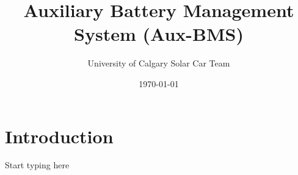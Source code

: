 \documentclass[titlepage]{article}
\title{\textbf{Auxiliary Battery Management System (Aux-BMS)}}
\author{University of Calgary Solar Car Team}
\date{\today}
\begin{document}
    \maketitle
    \section{Introduction}
    Start typing here
\end{document}
